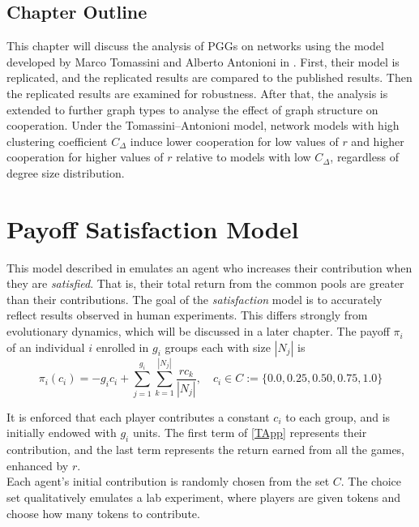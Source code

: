 

\subsection{Chapter Outline}
This chapter will discuss the analysis of PGGs on networks using the model developed by Marco Tomassini and Alberto Antonioni in \cite{RN49}. First, their model is replicated, and the replicated results are compared to the published results. Then the replicated results are examined for robustness. After that, the analysis is extended to further graph types to analyse the effect of graph structure on cooperation. Under the Tomassini--Antonioni model, network models with high clustering coefficient $C_\Delta$ induce lower cooperation for low values of $r$ and higher cooperation for higher values of $r$ relative to models with low $C_\Delta$, regardless of degree size distribution. \\

\section{Payoff Satisfaction Model}
This model described in \cite{RN49} emulates an agent who increases their contribution when they are \emph{satisfied}. That is, their total return from the common pools are greater than their contributions. The goal of the \emph{satisfaction} model is to accurately reflect results observed in human experiments. This differs strongly from evolutionary dynamics, which will be discussed in a later chapter. The payoff $\pi_i$ of an individual $i$ enrolled in $g_i$ groups each with size $|N_j|$ is \\
\begin{equation}
    \pi_i(c_i) = - g_ic_i + \sum_{j=1}^{g_i} \sum_{k=1}^{|N_j|} \frac{rc_k}{|N_j|}, \quad c_i \in C:= \{0.0, 0.25, 0.50, 0.75, 1.0\} \label{TApp}
\end{equation}

It is enforced that each player contributes a constant $c_i$ to each group, and is initially endowed with $g_i$ units. The first term of \eqref{TApp} represents their contribution, and the last term represents the return earned from all the games, enhanced by $r$. \\

Each agent's initial contribution is randomly chosen from the set $C$. The choice set qualitatively emulates a lab experiment, where players are given tokens and choose how many tokens to contribute. \\

